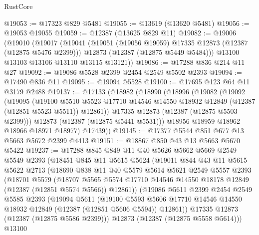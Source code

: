 \begin{lexlean}{RustCore}
\begin{coremodule}
@19053 := @17323 @829 @5481
@19055 := @13619 (@13620 @5481)
@19056 := @19053 @19055
@19059 := @12387 (@13625 @829 @11)
@19082 := @19006
    (@19010
      (@19017
        (@19041
          (@19051 (@19056 @19059) @17335 @12873 (@12387 (@12875 @5476 @2399)))
          @12873
          (@12387 (@12875 @5449 @5484)))
        @13100
        @13103
        @13106
        @13110
        @13115
        @13121))
@19086 := @17288 @836 @214 @11 @27
@19092 := @19086 @5528 @2399 @2454 @2549 @5502 @2393
@19094 := @17490 @836 @11
@19095 := @19094 @5528
@19100 := @17695 @123 @64 @11 @3179 @2488
@19137 := @17133
    (@18982
      (@18990
        (@18996
          (@19082
            (@19092
              (@19095
                (@19100
                  @5510
                  @5523
                  @17710
                  @14546
                  @14550
                  @18932
                  @12849
                  (@12387 (@12851 @5523 @5511))
                  @12861))
              @17335
              @12873
              (@12387 (@12875 @5503 @2399)))
            @12873
            (@12387 (@12875 @5441 @5531)))
          @18956
          @18959
          @18962
          @18966
          @18971
          @18977)
        @17439))
@19145 := @17377 @5544 @851 @677 @13 @5663 @5672 @2399 @4413
@19151 := @18867 @850 @43 @13 @5663 @5670 @5422
@19237 := @17288
    @845
    @849
    @11
    @40
    @5626
    @5662
    @5669
    @2549
    @5549
    @2393
    (@18451
      @845
      @11
      @5615
      @5624
      (@19011
        @844
        @43
        @11
        @5615
        @5622
        @2713
        (@18690
          @838
          @11
          @40
          @5579
          @5614
          @5621
          @2549
          @5557
          @2393
          (@18701
            @5579
            (@18707
              @5565
              @5574
              @17710
              @14546
              @14550
              @18178
              @12849
              (@12387 (@12851 @5574 @5566))
              @12861))
          (@19086
            @5611
            @2399
            @2454
            @2549
            @5585
            @2393
            (@19094
              @5611
              (@19100
                @5593
                @5606
                @17710
                @14546
                @14550
                @18932
                @12849
                (@12387 (@12851 @5606 @5594))
                @12861))
            @17335
            @12873
            (@12387 (@12875 @5586 @2399)))
          @12873
          (@12387 (@12875 @5558 @5614)))
        @13100

\end{coremodule}
\end{lexlean}
